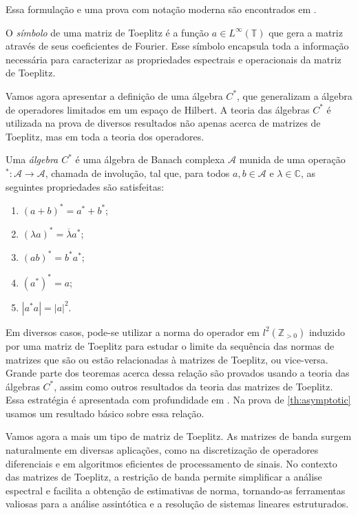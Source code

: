 Essa formulação e uma prova com notação moderna são encontrados em \cite[p. 1]{bottcher}.

O \textit{símbolo} de uma matriz de Toeplitz é a função $a \in L^\infty(\mathbb{T})$ que gera a matriz através de seus coeficientes de Fourier. Esse símbolo encapsula toda a informação necessária para caracterizar as propriedades espectrais e operacionais da matriz de Toeplitz.

Vamos agora apresentar a definição de uma álgebra $C^\ast$, que generalizam a álgebra de operadores limitados em um espaço de Hilbert. A teoria das álgebras $C^\ast$ é utilizada na prova de diversos resultados não apenas acerca de matrizes de Toeplitz, mas em toda a teoria dos operadores.

\begin{definition*} Uma \textit{álgebra $C^\ast$} é uma álgebra de Banach complexa $\mathcal{A}$ munida de uma operação $^\ast : \mathcal{A} \to \mathcal{A}$, chamada de involução, tal que, para todos $a, b \in \mathcal{A}$ e $\lambda \in \mathbb{C}$, as seguintes propriedades são satisfeitas:
  \begin{enumerate} \item $(a + b)^\ast = a^\ast + b^\ast$; \item $(\lambda a)^\ast = \overline{\lambda} a^\ast$; \item $(ab)^\ast = b^\ast a^\ast$; \item $(a^\ast)^\ast = a$; \item $|a^\ast a| = |a|^2$.
  \end{enumerate}
\end{definition*}

Em diversos casos, pode-se utilizar a norma do operador em $l^2(\mathbb{Z}_{> 0})$ induzido por uma matriz de Toeplitz para estudar o limite da sequência das normas de matrizes que são ou estão relacionadas à matrizes de Toeplitz, ou vice-versa. Grande parte dos teoremas acerca dessa relação são provados usando a teoria das álgebras $C^\ast$, assim como outros resultados da teoria das matrizes de Toeplitz. Essa estratégia é apresentada com profundidade em \cite{bottcher}. Na prova de \ref{th:asymptotic} usamos um resultado básico sobre essa relação.

Vamos agora a mais um tipo de matriz de Toeplitz. As matrizes de banda surgem naturalmente em diversas aplicações, como na discretização de operadores diferenciais e em algoritmos eficientes de processamento de sinais. No contexto das matrizes de Toeplitz, a restrição de banda permite simplificar a análise espectral e facilita a obtenção de estimativas de norma, tornando-as ferramentas valiosas para a análise assintótica e a resolução de sistemas lineares estruturados.

